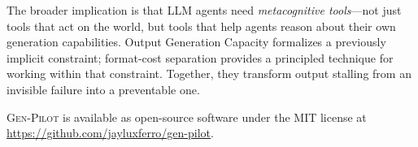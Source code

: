 \documentclass[11pt,twocolumn]{article}
\newcommand{\genpilot}{\textsc{Gen-Pilot}}
\begin{document}
The broader implication is that LLM agents need
\emph{metacognitive tools}---not just tools that act on the world,
but tools that help agents reason about their own generation
capabilities.  Output Generation Capacity formalizes a previously
implicit constraint; format-cost separation provides a principled
technique for working within that constraint.  Together, they
transform output stalling from an invisible failure into a
preventable one.

\genpilot{} is available as open-source software under the MIT
license at \url{https://github.com/jayluxferro/gen-pilot}.

\balance


\end{document}
